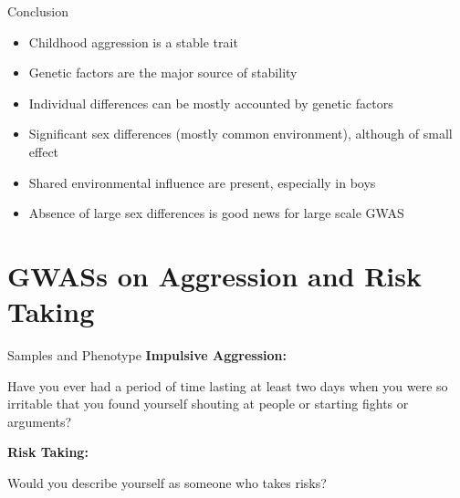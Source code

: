 \documentclass{beamer}
\begin{document}
  \begin{frame}[t]{Conclusion}
    \begin{itemize}
      \item Childhood aggression is a stable trait
      \item Genetic factors are the major source of stability
      \item Individual differences can be mostly accounted by genetic factors
      \item Significant sex differences (mostly common environment), although of small effect
      \item Shared environmental influence are present, especially in boys
      \item Absence of large sex differences is good news for large scale GWAS
    \end{itemize}	
  \end{frame}

  \section{GWASs on Aggression and Risk Taking}

  \begin{frame}[t]{Samples and Phenotype}
    \small
        \textbf{Impulsive Aggression:}
        \begin{displayquote}
          Have you ever had a period of time lasting at least two days when you were so irritable that you found yourself shouting at people or starting fights or arguments?
        \end{displayquote}
        \textbf{Risk Taking:}
        \begin{displayquote}
          Would you describe yourself as someone who takes risks?
        \end{displayquote}
        \resizebox{\textwidth}{!}{}
  \end{frame}
\end{document}

